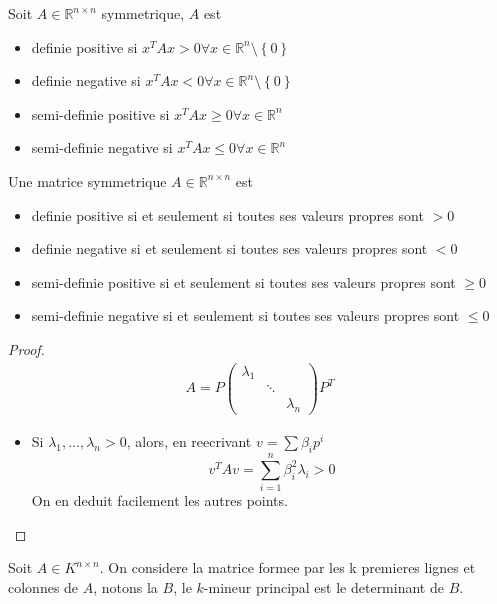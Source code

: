 \documentclass[../main.tex]{subfiles}
\begin{document}
\begin{defn}
	Soit $A \in \mathbb{R}^{n\times n}$ symmetrique, $A$ est 
	\begin{itemize}
	\item definie positive si $x^{T}Ax >0 \forall x\in \mathbb{R}^{n}\setminus \left\{ 0 \right\} $
	\item definie negative si $x^{T}Ax <0 \forall x \in \mathbb{R}^{n}\setminus \left\{ 0 \right\} $ 
	\item semi-definie positive si $x^{T}Ax \geq 0\forall x \in \mathbb{R}^{n}$ 
	\item semi-definie negative si $x^{T}Ax \leq 0\forall x \in \mathbb{R}^{n}$ 
	\end{itemize}
	
	
\end{defn}
\begin{thm}
	Une matrice symmetrique $A \in \mathbb{R}^{n\times n}$ est
	\begin{itemize}
	\item definie positive si et seulement si toutes ses valeurs propres sont $>0$
	\item definie negative si et seulement si toutes ses valeurs propres sont $<0$
	\item semi-definie positive si et seulement si toutes ses valeurs propres sont $\geq0$
	\item semi-definie negative si et seulement si toutes ses valeurs propres sont $\leq0$
	\end{itemize}
\end{thm}
\begin{proof}
\begin{align*}
A= P 
\begin{pmatrix}
	\lambda_1 & &\\
		  & \ddots &\\
		  & & \lambda_n
\end{pmatrix}
P^{T}
\end{align*}
\begin{itemize}
\item Si $\lambda_1, \ldots, \lambda_n>0$, alors, en reecrivant $v= \sum \beta_i p^{i}$
	\[ 
	v^{T}Av =  \sum_{i=1}^{ n}\beta_i ^{2} \lambda_i >0
\]
On en deduit facilement les autres points.
	
\end{itemize}


\end{proof}
\begin{defn}
	Soit $A \in K^{n\times n}$. On considere la matrice formee par les k premieres lignes et colonnes de $A$, notons la $B$, le $k$-mineur principal est le determinant de $B$.
\end{defn}
\end{document}
